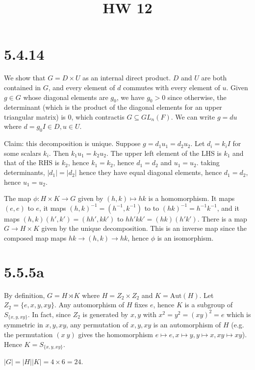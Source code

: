 \documentclass{article}
\title{HW 12}
\date{}
\def\inv{{-1}}
\def\Aut{\textrm{Aut}}
\begin{document}
\maketitle

\section*{5.4.14}

We show that $G = D \times U$ as an internal direct product. $D$ and $U$ are both contained in $G$, and every element of $d$ commutes with every element of $u$. Given $g \in G$ whose diagonal elements are $g_0$, we have $g_0 > 0$ since otherwise, the determinant (which is the product of the diagonal elements for an upper triangular matrix) is 0, which contractis $G \subseteq GL_n(F)$. We can write $g = d u$ where $d = g_0 I \in D, u \in U$.

Claim: this decomposition is unique. Suppose $g = d_1 u_1 = d_2 u_2$. Let $d_i = k_i I$ for some scalars $k_i$. Then $k_1 u_1 = k_2 u_2$. The upper left element of the LHS is $k_1$ and that of the RHS is $k_2$, hence $k_1 = k_2$, hence $d_1 = d_2$ and $u_1 = u_2$.
 taking determinants, $|d_1| = |d_2|$ hence they have equal diagonal elements, hence $d_1 = d_2$, hence $u_1 = u_2$.

The map $\phi: H \times K \to G$ given by $(h, k) \mapsto h k$ is a homomorphism. It maps $(e, e)$ to $e$, it maps $(h, k)^\inv = (h^\inv, k^\inv)$ to to $(hk)^\inv = h^\inv k^\inv$, and it maps $(h, k)(h', k') = (hh', kk')$ to $hh'kk' = (hk)(h'k')$. There is a map $G \to H \times K$ given by the unique decomposition. This is an inverse map since the composed map maps $hk \to (h, k) \to hk$, hence $\phi$ is an isomorphism.

\section*{5.5.5a}

By definition, $G = H \rtimes K$ where $H = Z_2 \times Z_2$ and $K = \Aut(H)$. Let $Z_2 = \{e, x, y, xy\}$. Any automorphism of $H$ fixes $e$, hence $K$ is a subgroup of $S_{\{x, y, xy\}}$. In fact, since $Z_2$ is generated by $x, y$ with $x^2 = y^2 = (xy)^2 = e$ which is symmetric in $x, y, xy$, any permutation of $x, y, xy$ is an automorphism of $H$ (e.g. the permutation $(x\ y)$ gives the homomorphism $e \mapsto e, x \mapsto y, y \mapsto x, xy \mapsto xy$). Hence $K = S_{\{x, y, xy\}}$.

$|G| = |H||K| = 4 \times 6 = 24$.
\end{document}
